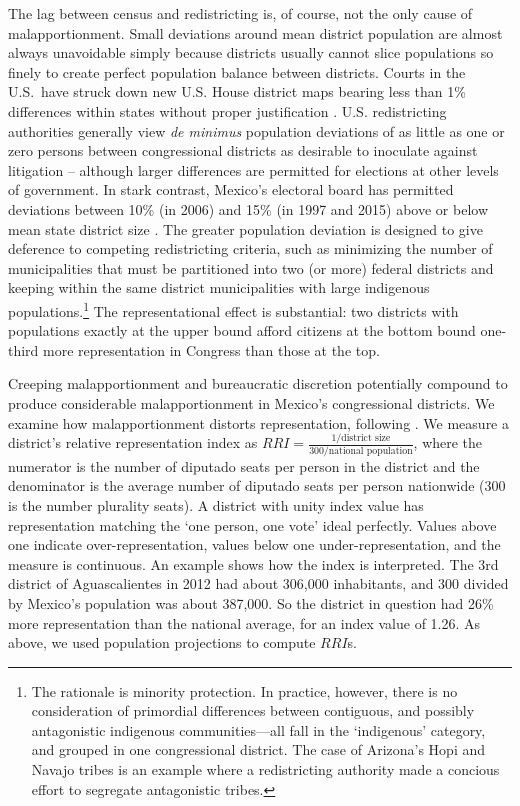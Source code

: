 \documentclass[letter,12pt]{article}
\begin{document}
The lag between census and redistricting is, of course, not the only cause of malapportionment. Small deviations around mean district population are almost always unavoidable simply because districts usually cannot slice populations so finely to create perfect population balance between districts. Courts in the U.S.\ have struck down new U.S. House district maps bearing less than 1\% differences within states without proper justification \citep{tuckerApportionment.1985}. U.S. redistricting authorities generally view \emph{de minimus} population deviations of as little as one or zero persons between congressional districts as desirable to inoculate against litigation -- although larger differences are permitted for elections at other levels of government. In stark contrast, Mexico's electoral board has permitted deviations between 10\% (in 2006) and 15\% (in 1997 and 2015) above or below mean state district size \citep{lujambio.vives.2008,trelles.mtz.polygob2012}. The greater population deviation is designed to give deference to competing redistricting criteria, such as minimizing the number of municipalities that must be partitioned into two (or more) federal districts and keeping within the same district municipalities with large indigenous populations.\footnote{The rationale is minority protection. In practice, however, there is no consideration of primordial differences between contiguous, and possibly antagonistic indigenous communities---all fall in the `indigenous' category, and grouped in one congressional district. The case of Arizona's Hopi and Navajo tribes is an example where a redistricting authority made a concious effort to segregate antagonistic tribes.} The representational effect is substantial: two districts with populations exactly at the upper bound afford citizens at the bottom bound one-third more representation in Congress than those at the top. 

Creeping malapportionment and bureaucratic discretion potentially compound to produce considerable malapportionment in Mexico's congressional districts. We examine how malapportionment distorts representation, following \citet{ansolabehere.gerber.snyderCourtRedis2002}. We measure a district's relative representation index as $RRI = \frac{1/\text{district size}}{300/\text{national population}}$, where the numerator is the number of diputado seats per person in the district and the denominator is the average number of diputado seats per person nationwide (300 is the number plurality seats). A district with unity index value has representation matching the `one person, one vote' ideal perfectly. Values above one indicate over-representation, values below one under-representation, and the measure is continuous. An example shows how the index is interpreted. The 3rd district of Aguascalientes in 2012 had about 306,000 inhabitants, and 300 divided by Mexico's population was about 387,000. So the district in question had 26\% more representation than the national average, for an index value of 1.26. As above, we used population projections to compute $RRI$s.
\end{document}

